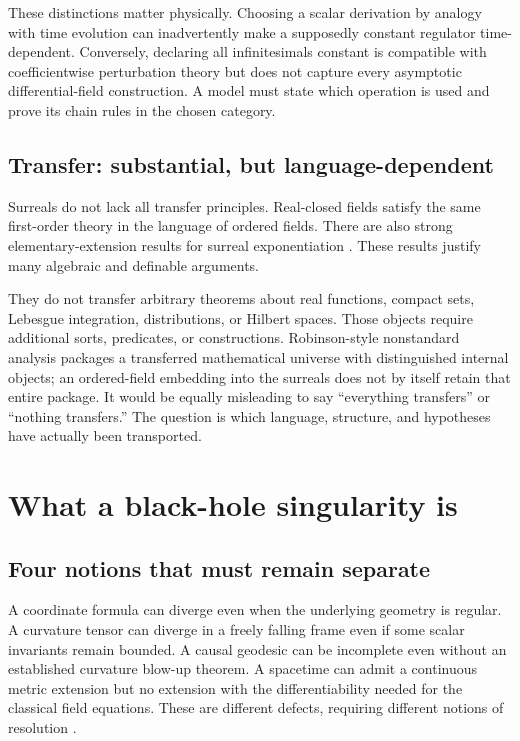 \documentclass[11pt,letterpaper]{article}
\theoremstyle{definition}
\theoremstyle{remark}
\begin{document}
These distinctions matter physically. Choosing a scalar derivation by analogy
with time evolution can inadvertently make a supposedly constant regulator
time-dependent. Conversely, declaring all infinitesimals constant is compatible
with coefficientwise perturbation theory but does not capture every
asymptotic differential-field construction. A model must state which operation
is used and prove its chain rules in the chosen category.

\subsection{Transfer: substantial, but language-dependent}

Surreals do not lack all transfer principles. Real-closed fields satisfy the
same first-order theory in the language of ordered fields. There are also
strong elementary-extension results for surreal exponentiation
\cite{vanDenDriesEhrlich}. These results justify many algebraic and definable
arguments.

They do not transfer arbitrary theorems about real functions, compact sets,
Lebesgue integration, distributions, or Hilbert spaces. Those objects require
additional sorts, predicates, or constructions. Robinson-style nonstandard
analysis packages a transferred mathematical universe with distinguished
internal objects; an ordered-field embedding into the surreals does not by
itself retain that entire package. It would be equally misleading to say
``everything transfers'' or ``nothing transfers.'' The question is which
language, structure, and hypotheses have actually been transported.

\section{What a black-hole singularity is}
\label{sec:singularity}

\subsection{Four notions that must remain separate}

A coordinate formula can diverge even when the underlying geometry is regular.
A curvature tensor can diverge in a freely falling frame even if some scalar
invariants remain bounded. A causal geodesic can be incomplete even without
an established curvature blow-up theorem. A spacetime can admit a continuous
metric extension but no extension with the differentiability needed for the
classical field equations. These are different defects, requiring different
notions of resolution \cite{Witten,Landsman,DafermosLuk}.
\end{document}
